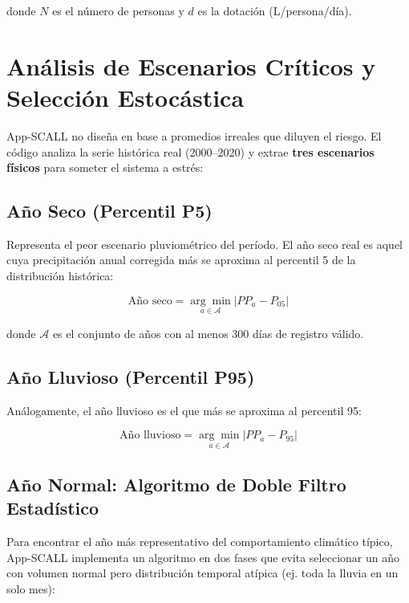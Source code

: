 \documentclass[12pt, a4paper]{article}
\begin{document}
donde $N$ es el número de personas y $d$ es la dotación (L/persona/día).

\section{Análisis de Escenarios Críticos y Selección Estocástica}

App-SCALL no diseña en base a promedios irreales que diluyen el riesgo. El código analiza la serie histórica real (2000--2020) y extrae \textbf{tres escenarios físicos} para someter el sistema a estrés:

\subsection{Año Seco (Percentil P5)}

Representa el peor escenario pluviométrico del período. El año seco real es aquel cuya precipitación anual corregida más se aproxima al percentil 5 de la distribución histórica:

\begin{equation}
    \text{Año seco} = \underset{a \in \mathcal{A}}{\arg\min}\left|PP_a - P_{05}\right|
\end{equation}

donde $\mathcal{A}$ es el conjunto de años con al menos 300 días de registro válido.

\subsection{Año Lluvioso (Percentil P95)}

Análogamente, el año lluvioso es el que más se aproxima al percentil 95:

\begin{equation}
    \text{Año lluvioso} = \underset{a \in \mathcal{A}}{\arg\min}\left|PP_a - P_{95}\right|
\end{equation}

\subsection{Año Normal: Algoritmo de Doble Filtro Estadístico}

Para encontrar el año más representativo del comportamiento climático típico, App-SCALL implementa un algoritmo en dos fases que evita seleccionar un año con volumen normal pero distribución temporal atípica (ej. toda la lluvia en un solo mes):
\end{document}
